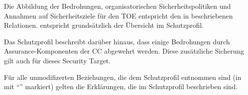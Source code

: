 















Die Abbildung der Bedrohungen, organisatorischen Sicherheitspolitiken und
Annahmen auf Sicherheitsziele für den TOE entspricht den in \citepp{}
beschriebenen Relationen.  entspricht grundsätzlich der
Übersicht im Schutzprofil.

Das Schutzprofil beschreibt darüber hinaus, dass einige Bedrohungen
durch Assurance-Komponenten der CC abgewehrt werden. Diese zusätzliche
Sicherung gilt auch für dieses Security Target.

\afterpage{%
  \clearpage%
  \begin{landscape}%
    \centering %
    \small
    
  \end{landscape}
  \clearpage%
}


Für alle unmodifizerten Beziehungen, die dem Schutzprofil entnommen
sind (in  mit "`\tcheck{}"' markiert) gelten
die Erklärungen, die im Schutzprofil beschrieben sind.

